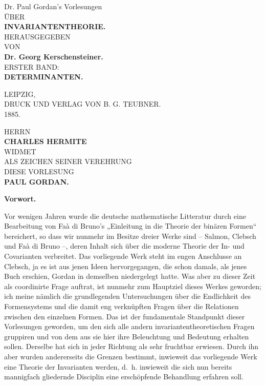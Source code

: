 \documentclass[10pt]{article}
\newcommand{\TeubnerMark}{\begin{center}\setlength{\fboxsep}{1pt}\fbox{\scriptsize\bfseries B\,G\,T}\end{center}}
\begin{document}
\small

\begin{center}
{\large Dr. Paul Gordan's Vorlesungen}\\[0.45em]
{\scriptsize ÜBER}\\[0.65em]
{\LARGE\bfseries INVARIANTENTHEORIE.}\\[1.6em]
{\scriptsize HERAUSGEGEBEN}\\[0.45em]
{\scriptsize VON}\\[0.65em]
{\bfseries Dr. Georg Kerschensteiner.}\\[1.6em]
{\scriptsize ERSTER BAND:}\\[0.45em]
{\large\bfseries DETERMINANTEN.}\\[1.5em]
\TeubnerMark
\vfill
{\small LEIPZIG,}\\[0.25em]
{\scriptsize DRUCK UND VERLAG VON B. G. TEUBNER.}\\[0.25em]
{\small 1885.}
\end{center}

\newpage

\begin{center}
{\small HERRN}\\[0.9em]
{\Large\bfseries CHARLES HERMITE}\\[0.8em]
{\scriptsize WIDMET}\\[0.8em]
{\small ALS ZEICHEN SEINER VEREHRUNG}\\[0.8em]
{\scriptsize DIESE VORLESUNG}\\[0.8em]
{\bfseries PAUL GORDAN.}
\end{center}

\newpage

\begin{center}
{\bfseries Vorwort.}
\end{center}

Vor wenigen Jahren wurde die deutsche mathematische Litteratur durch eine Bearbeitung von Faà di Bruno's „Einleitung in die Theorie der binären Formen“ bereichert, so dass wir nunmehr im Besitze dreier Werke sind -- Salmon, Clebsch und Faà di Bruno --, deren Inhalt sich über die moderne Theorie der In- und Covarianten verbreitet. Das vorliegende Werk steht im engen Anschlusse an Clebsch, ja es ist aus jenen Ideen hervorgegangen, die schon damals, als jenes Buch erschien, Gordan in demselben niedergelegt hatte. Was aber zu dieser Zeit als coordinirte Frage auftrat, ist nunmehr zum Hauptziel dieses Werkes geworden; ich meine nämlich die grundlegenden Untersuchungen über die Endlichkeit des Formensystems und die damit eng verknüpften Fragen über die Relationen zwischen den einzelnen Formen. Das ist der fundamentale Standpunkt dieser Vorlesungen geworden, um den sich alle andern invariantentheoretischen Fragen gruppiren und von dem aus sie hier ihre Beleuchtung und Bedeutung erhalten sollen. Derselbe hat sich in jeder Richtung als sehr fruchtbar erwiesen. Durch ihn aber wurden andererseits die Grenzen bestimmt, inwieweit das vorliegende Werk eine Theorie der Invarianten werden, d.\ h. inwieweit die sich nun bereits mannigfach gliedernde Disciplin eine erschöpfende Behandlung erfahren soll.
\end{document}
